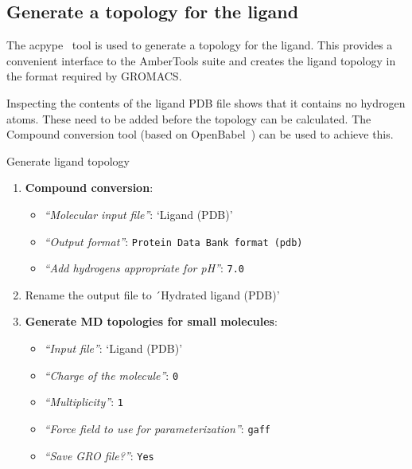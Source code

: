 \documentclass[twocolumn]{bmcart}%
\providecommand{\tightlist}{%
  \setlength{\itemsep}{0pt}\setlength{\parskip}{0pt}}
\begin{document}
\subsection*{Generate a topology for the
ligand}\label{generate-a-topology-for-the-ligand}

The acpype~\cite{SousadaSilva2012} tool is used to generate a topology for the ligand. This provides a convenient interface to the AmberTools suite and creates the ligand topology in the format required by
GROMACS.

Inspecting the contents of the ligand PDB file shows that it contains no hydrogen atoms. These need to be added before the topology can be calculated. The Compound conversion tool (based on OpenBabel~\cite{OBoyle2011}) can be used to achieve this.

\begin{handson_box_colour}{Generate ligand topology}

\begin{enumerate}
\def\labelenumi{\arabic{enumi}.}
\tightlist
\item
  \textbf{Compound conversion}:

  \begin{itemize}
  \tightlist
  \item
    \emph{``Molecular input file''}: `Ligand (PDB)'
  \item
    \emph{``Output format''}: \texttt{Protein Data Bank format (pdb)}
  \item
    \emph{``Add hydrogens appropriate for pH''}: \texttt{7.0}
  \end{itemize}
\item  
  Rename the output file to ´Hydrated ligand (PDB)'

\item
  \textbf{Generate MD topologies for small molecules}:
  \begin{itemize}
  \tightlist
  \item
    \emph{``Input file''}: `Ligand (PDB)'
  \item
    \emph{``Charge of the molecule''}: \texttt{0}
  \item
    \emph{``Multiplicity''}: \texttt{1}
  \item
    \emph{``Force field to use for parameterization''}:
    \texttt{gaff}
  \item
    \emph{``Save GRO file?''}: \texttt{Yes}
  \end{itemize}
\end{enumerate}

\end{handson_box_colour}
\end{document}
